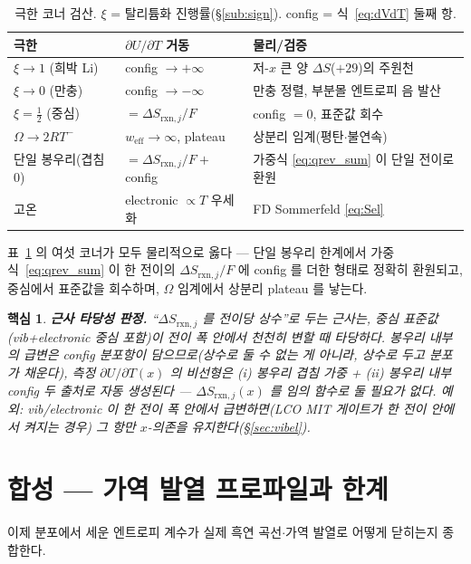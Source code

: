 \documentclass[11pt,a4paper]{article}
\newtheorem*{keybox}{핵심}
\newcommand{\rxn}{\mathrm{rxn}}
\newcommand{\eff}{\mathrm{eff}}
\begin{document}
\begin{table}[t]
\centering\small
\renewcommand{\arraystretch}{1.25}
\caption{극한 코너 검산. $\xi$ = 탈리튬화 진행률(\S\ref{sub:sign}). config = 식~\eqref{eq:dVdT} 둘째 항.}
\label{tab:limits}
\begin{tabular}{l l l}
\toprule
극한 & $\partial U/\partial T$ 거동 & 물리/검증 \\
\midrule
$\xi\to1$ (희박 Li) & config $\to+\infty$ & 저-$x$ 큰 양 $\Delta S$($+29$)의 주원천 \\
$\xi\to0$ (만충) & config $\to-\infty$ & 만충 정렬, 부분몰 엔트로피 음 발산 \\
$\xi=\tfrac12$ (중심) & $=\Delta S_{\rxn,j}/F$ & config $=0$, 표준값 회수 \\
$\Omega\to2RT^-$ & $w_\eff\to\infty$, plateau & 상분리 임계(평탄$\cdot$불연속) \\
단일 봉우리(겹침 0) & $=\Delta S_{\rxn,j}/F+$config & 가중식 \eqref{eq:qrev_sum} 이 단일 전이로 환원 \\
고온 & electronic $\propto T$ 우세화 & FD Sommerfeld \eqref{eq:Sel} \\
\bottomrule
\end{tabular}
\end{table}

표~\ref{tab:limits} 의 여섯 코너가 모두 물리적으로 옳다 — 단일 봉우리 한계에서 가중식~\eqref{eq:qrev_sum}
이 한 전이의 $\Delta S_{\rxn,j}/F$ 에 config 를 더한 형태로 정확히 환원되고, 중심에서 표준값을 회수하며,
$\Omega$ 임계에서 상분리 plateau 를 낳는다.

\begin{keybox}
\textbf{근사 타당성 판정.} ``$\Delta S_{\rxn,j}$ 를 전이당 상수''로 두는 근사는, 중심 표준값
(vib+electronic 중심 포함)이 \emph{전이 폭 안에서 천천히 변할 때} 타당하다. 봉우리 내부의 \emph{급변}은
config 분포항이 담으므로(상수로 둘 수 없는 게 아니라, 상수로 두고 분포가 채운다), 측정 $\partial U/\partial
T(x)$ 의 비선형은 (i) 봉우리 겹침 가중 + (ii) 봉우리 내부 config 두 출처로 \emph{자동 생성}된다 —
$\Delta S_{\rxn,j}(x)$ 를 임의 함수로 둘 필요가 없다. \emph{예외}: vib/electronic 이 한 전이 폭 안에서
급변하면(LCO MIT 게이트가 한 전이 안에서 켜지는 경우) 그 항만 $x$-의존을 유지한다(\S\ref{sec:vibel}).
\end{keybox}

\section{합성 — 가역 발열 프로파일과 한계}\label{sec:synth}
이제 분포에서 세운 엔트로피 계수가 실제 흑연 곡선$\cdot$가역 발열로 어떻게 닫히는지 종합한다.
\end{document}
